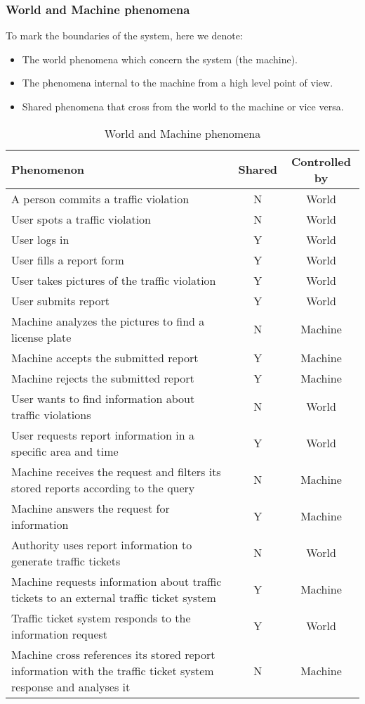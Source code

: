 \subsubsection{World and Machine phenomena}
To mark the boundaries of the system, here we denote:
    \begin{itemize}
        \item The world phenomena which concern the system (the machine).
        \item The phenomena internal to the machine from a high level point of view.
        \item Shared phenomena that cross from the world to the machine or vice versa.
    \end{itemize}

\begin{table}[H]
    \centering
    \begin{tabular}{|p{10cm}|c|c|}
    \hline
    \textbf{Phenomenon} & \textbf{Shared} & \textbf{Controlled by} \\ \hline
    A person commits a traffic violation & N & World \\ \hline
    User spots a traffic violation & N & World \\ \hline
    User logs in & Y & World \\ \hline
    User fills a report form & Y & World \\ \hline
    User takes pictures of the traffic violation & Y & World \\ \hline
    User submits report & Y & World \\ \hline
    Machine analyzes the pictures to find a license plate & N & Machine \\ \hline
    Machine accepts the submitted report & Y & Machine \\ \hline
    Machine rejects the submitted report & Y & Machine \\ \hline
    User wants to find information about traffic violations & N & World \\ \hline
    User requests report information in a specific area and time & Y & World \\ \hline
    Machine receives the request and filters its stored reports according to the query & N & Machine \\ \hline
    Machine answers the request for information & Y & Machine \\ \hline
    Authority uses report information to generate traffic tickets & N & World \\ \hline
    Machine requests information about traffic tickets to an external traffic ticket system & Y & Machine \\ \hline
    Traffic ticket system responds to the information request & Y & World \\ \hline
    Machine cross references its stored report information with the traffic ticket system response and analyses it & N & Machine \\ \hline
    \end{tabular}
    \caption{\label{tbl} World and Machine phenomena}
    \end{table}


